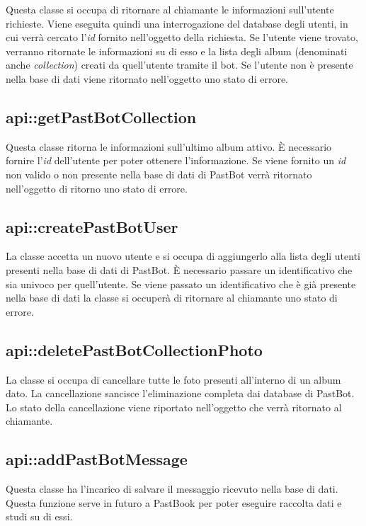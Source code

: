Questa classe si occupa di ritornare al chiamante le informazioni sull'utente
richieste. Viene eseguita quindi una interrogazione del database degli utenti,
in cui verrà cercato l'\textit{id} fornito nell'oggetto della richiesta. Se
l'utente viene trovato, verranno ritornate le informazioni su di esso e la
lista degli album (denominati anche \textit{collection}) creati da quell'utente
tramite il bot.
Se l'utente non è presente nella base di dati viene ritornato nell'oggetto uno
stato di errore.

\subsection{api::getPastBotCollection}

Questa classe ritorna le informazioni sull'ultimo album attivo. È necessario
fornire l'\textit{id} dell'utente per poter ottenere l'informazione.
Se viene fornito un \textit{id} non valido o non presente nella base di dati di
PastBot verrà ritornato nell'oggetto di ritorno uno stato di errore.

\subsection{api::createPastBotUser}

La classe accetta un nuovo utente e si occupa di aggiungerlo alla lista
degli utenti presenti nella base di dati di PastBot. È necessario passare un
identificativo che sia univoco per quell'utente. Se viene passato un
identificativo che è già presente nella base di dati la classe si occuperà di
ritornare al chiamante uno stato di errore.

\subsection{api::deletePastBotCollectionPhoto}

La classe si occupa di cancellare tutte le foto presenti all'interno di un
album dato. La cancellazione sancisce l'eliminazione completa dai database di
PastBot.
Lo stato della cancellazione viene riportato nell'oggetto che verrà ritornato
al chiamante.

\subsection{api::addPastBotMessage}

Questa classe ha l'incarico di salvare il messaggio ricevuto nella base di
dati. Questa funzione serve in futuro a PastBook per poter eseguire raccolta
dati e studi su di essi.

